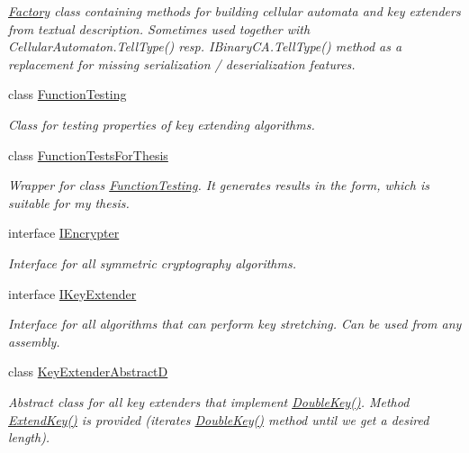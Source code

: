 \begin{DoxyCompactItemize}
\begin{DoxyCompactList}\small\item\em \hyperlink{class_crypto_1_1_factory}{Factory} class containing methods for building cellular automata and key extenders from textual description. Sometimes used together with {\ttfamily Cellular\+Automaton.\+Tell\+Type()} resp. {\ttfamily I\+Binary\+C\+A.\+Tell\+Type()} method as a replacement for missing serialization / deserialization features. \end{DoxyCompactList}\item 
class \hyperlink{class_crypto_1_1_function_testing}{Function\+Testing}
\begin{DoxyCompactList}\small\item\em Class for testing properties of key extending algorithms. \end{DoxyCompactList}\item 
class \hyperlink{class_crypto_1_1_function_tests_for_thesis}{Function\+Tests\+For\+Thesis}
\begin{DoxyCompactList}\small\item\em Wrapper for class {\ttfamily \hyperlink{class_crypto_1_1_function_testing}{Function\+Testing}}. It generates results in the form, which is suitable for my thesis. \end{DoxyCompactList}\item 
interface \hyperlink{interface_crypto_1_1_i_encrypter}{I\+Encrypter}
\begin{DoxyCompactList}\small\item\em Interface for all symmetric cryptography algorithms. \end{DoxyCompactList}\item 
interface \hyperlink{interface_crypto_1_1_i_key_extender}{I\+Key\+Extender}
\begin{DoxyCompactList}\small\item\em Interface for all algorithms that can perform key stretching. Can be used from any assembly. \end{DoxyCompactList}\item 
class \hyperlink{class_crypto_1_1_key_extender_abstract_d}{Key\+Extender\+Abstract\+D}
\begin{DoxyCompactList}\small\item\em Abstract class for all key extenders that implement \hyperlink{class_crypto_1_1_key_extender_abstract_d_ae403b92e9038b9c0bc7a21885e24ffc7}{Double\+Key()}. Method \hyperlink{class_crypto_1_1_key_extender_abstract_d_a3ec7fa96f391d840043eff0c8409d130}{Extend\+Key()} is provided (iterates \hyperlink{class_crypto_1_1_key_extender_abstract_d_ae403b92e9038b9c0bc7a21885e24ffc7}{Double\+Key()} method until we get a desired length). \end{DoxyCompactList}\item 

\end{DoxyCompactItemize}
